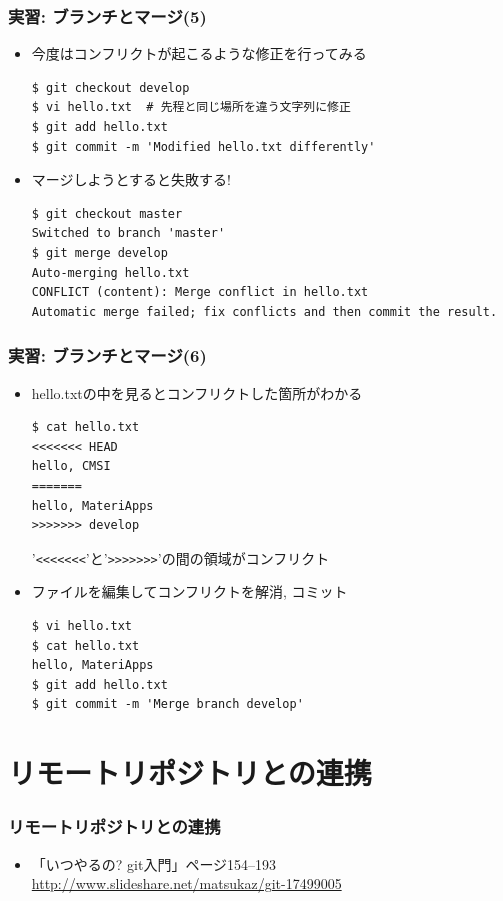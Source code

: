 \begin{frame}[t,fragile]
  \frametitle{実習: ブランチとマージ(5)}
  \begin{itemize}
  \item 今度はコンフリクトが起こるような修正を行ってみる
\begin{lstlisting}
$ git checkout develop
$ vi hello.txt  # 先程と同じ場所を違う文字列に修正
$ git add hello.txt
$ git commit -m 'Modified hello.txt differently'
\end{lstlisting}
  \item マージしようとすると失敗する!
\begin{lstlisting}
$ git checkout master
Switched to branch 'master'
$ git merge develop
Auto-merging hello.txt
CONFLICT (content): Merge conflict in hello.txt
Automatic merge failed; fix conflicts and then commit the result.
\end{lstlisting}
  \end{itemize}
\end{frame}

\begin{frame}[t,fragile]
  \frametitle{実習: ブランチとマージ(6)}
  \begin{itemize}
  \item hello.txtの中を見るとコンフリクトした箇所がわかる
\begin{lstlisting}
$ cat hello.txt
<<<<<<< HEAD
hello, CMSI
=======
hello, MateriApps
>>>>>>> develop
\end{lstlisting}
'\verb+<<<<<<<+'と'\verb+>>>>>>>+'の間の領域がコンフリクト \\[.0em]
  \item ファイルを編集してコンフリクトを解消, コミット
\begin{lstlisting}
$ vi hello.txt
$ cat hello.txt
hello, MateriApps
$ git add hello.txt
$ git commit -m 'Merge branch develop'
\end{lstlisting}
  \end{itemize}
\end{frame}

\section{リモートリポジトリとの連携}

\begin{frame}
  \frametitle{リモートリポジトリとの連携}
  \begin{itemize}
  \item 「いつやるの? git入門」ページ154--193 \\
    \url{http://www.slideshare.net/matsukaz/git-17499005}
  \end{itemize}
\end{frame}

